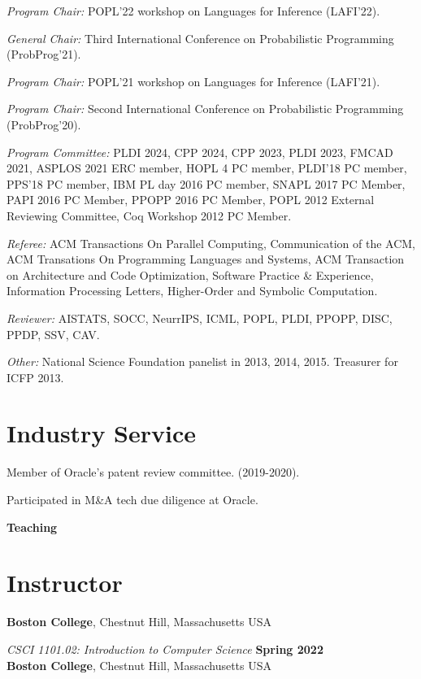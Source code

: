 \documentclass[margin,line]{res}
\begin{document}
\begin{resume}
{\em Program Chair:} POPL'22 workshop on Languages for Inference (LAFI'22).

{\em General Chair:} Third International Conference on Probabilistic Programming (ProbProg'21).

{\em Program Chair:} POPL'21 workshop on Languages for Inference (LAFI'21).

{\em Program Chair:} Second International Conference on Probabilistic Programming (ProbProg'20).

{\em Program Committee:} PLDI 2024, CPP 2024, CPP 2023, PLDI 2023,
FMCAD 2021, ASPLOS 2021 ERC member, HOPL 4 PC member, PLDI'18 PC
member, PPS'18 PC member, IBM PL day 2016 PC member, SNAPL 2017 PC
Member, PAPI 2016 PC Member, PPOPP 2016 PC Member, POPL 2012 External
Reviewing Committee, Coq Workshop 2012 PC Member.

{\em Referee:} ACM Transactions On Parallel Computing, Communication of the ACM, ACM Transations On Programming Languages and Systems, ACM Transaction on Architecture and Code Optimization, 
Software Practice \& Experience, Information Processing Letters, Higher-Order and Symbolic Computation.

{\em Reviewer:} AISTATS, SOCC, NeurrIPS, ICML, POPL, PLDI, PPOPP, DISC, PPDP, SSV,
CAV.

{\em Other:} National Science Foundation panelist in 2013, 2014, 2015. Treasurer for ICFP 2013.

\section{\sc Industry Service}

Member of Oracle's patent review committee. (2019-2020).

Participated in M\&A tech due diligence at Oracle.

\newpage
  {\bf {\Large Teaching}}

\section{\sc Instructor}

{\bf Boston College}, Chestnut Hill, Massachusetts USA
\vspace{-.4cm}

{\em CSCI 1101.02: Introduction  to Computer Science} \hfill {\bf Spring 2022}\\
{\bf Boston College}, Chestnut Hill, Massachusetts USA
\vspace{-.4cm}


\end{resume}
\end{document}

